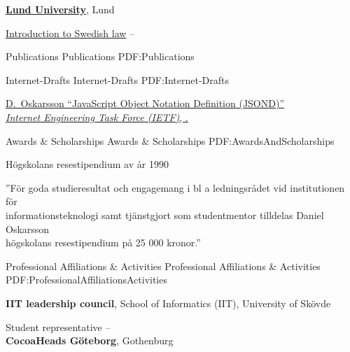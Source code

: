 \documentclass[letterpaper,MMMyyyy,nonstopmode]{simpleresumecv}
\begin{document}
\begin{Body}
\BigGap
\Entry
\href{https://www.law.lu.se/}
{\textbf{Lund University}},
Lund

\Gap
\BulletItem
\href{https://www.lu.se/lubas/i-uoh-lu-JURF11}
{Introduction to Swedish law}
\hfill
{} --


\Section
{Publications}
{Publications}
{PDF:Publications}

\SubSection
{Internet-Drafts}
{Internet-Drafts}
{PDF:Internet-Drafts}

\begingroup
\renewcommand{\MaxNumberedItem}{[88]}

\BigGap
\BulletItem
\href{https://www.ietf.org/archive/id/draft-oskarsson-jsond-00.txt}
{\underline{D.~Oskarsson}
``JavaScript Object Notation Definition (JSOND)''\\
\textit{Internet Engineering Task Force (IETF)}, .}

\endgroup



\Section
{Awards \&\newline
Scholarships}
{Awards \& Scholarships}
{PDF:AwardsAndScholarships}

\BulletItem
Högskolans resestipendium av år 1990
\hfill
{}
\begin{Detail}
\Item
''För goda studieresultat och engagemang i bl a ledningsrådet vid institutionen för\\
informationsteknologi samt tjänstgjort som studentmentor tilldelas Daniel Oskarsson\\
högskolans resestipendium på 25 000 kronor.''
\end{Detail}


\Section
{Professional Affiliations\newline
\& Activities}
{Professional Affiliations \& Activities}
{PDF:ProfessionalAffiliationsActivities}

\Entry
\textbf{IIT leadership council}, School of Informatics (IIT), University of Skövde

\Gap
\BulletItem
Student representative
\hfill
{} -- 
\\
\Entry
\textbf{CocoaHeads Göteborg}, Gothenburg


\end{Body}
\end{document}
